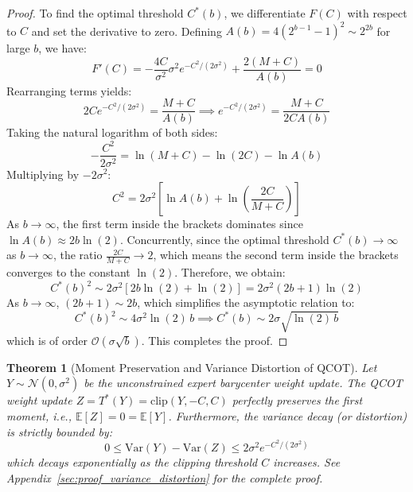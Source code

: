 \documentclass{article}
\theoremstyle{plain}
\newtheorem{theorem}{Theorem}[section]
\theoremstyle{definition}
\theoremstyle{remark}
\begin{document}
\begin{proof}
To find the optimal threshold $C^*(b)$, we differentiate $F(C)$ with respect to $C$ and set the derivative to zero. Defining $A(b) = 4 (2^{b-1} - 1)^2 \sim 2^{2b}$ for large $b$, we have:
\begin{equation}
    F'(C) = -\frac{4C}{\sigma^2} \sigma^2 e^{-C^2 / (2\sigma^2)} + \frac{2(M + C)}{A(b)} = 0
\end{equation}
Rearranging terms yields:
\begin{equation}
    2C e^{-C^2 / (2\sigma^2)} = \frac{M + C}{A(b)} \implies e^{-C^2 / (2\sigma^2)} = \frac{M + C}{2C A(b)}
\end{equation}
Taking the natural logarithm of both sides:
\begin{equation}
    -\frac{C^2}{2\sigma^2} = \ln(M + C) - \ln(2C) - \ln A(b)
\end{equation}
Multiplying by $-2\sigma^2$:
\begin{equation}
    C^2 = 2\sigma^2 \left[ \ln A(b) + \ln\left(\frac{2C}{M + C}\right) \right]
\end{equation}
As $b \to \infty$, the first term inside the brackets dominates since $\ln A(b) \approx 2b \ln(2)$. Concurrently, since the optimal threshold $C^*(b) \to \infty$ as $b \to \infty$, the ratio $\frac{2C}{M+C} \to 2$, which means the second term inside the brackets converges to the constant $\ln(2)$. Therefore, we obtain:
\begin{equation}
    C^*(b)^2 \sim 2\sigma^2 \left[ 2b \ln(2) + \ln(2) \right] = 2\sigma^2 (2b + 1) \ln(2)
\end{equation}
As $b \to \infty$, $(2b + 1) \sim 2b$, which simplifies the asymptotic relation to:
\begin{equation}
    C^*(b)^2 \sim 4\sigma^2 \ln(2) \, b \implies C^*(b) \sim 2\sigma \sqrt{\ln(2) \, b}
\end{equation}
which is of order $\mathcal{O}(\sigma \sqrt{b})$. This completes the proof.
\end{proof}

\begin{theorem}[Moment Preservation and Variance Distortion of QCOT]
Let $Y \sim \mathcal{N}(0, \sigma^2)$ be the unconstrained expert barycenter weight update. The QCOT weight update $Z = T^*(Y) = \text{clip}(Y, -C, C)$ perfectly preserves the first moment, i.e., $\mathbb{E}[Z] = 0 = \mathbb{E}[Y]$. Furthermore, the variance decay (or distortion) is strictly bounded by:
\begin{equation}
    0 \le \text{Var}(Y) - \text{Var}(Z) \le 2\sigma^2 e^{-C^2 / (2\sigma^2)}
\end{equation}
which decays exponentially as the clipping threshold $C$ increases. See Appendix~\ref{sec:proof_variance_distortion} for the complete proof.
\label{thm:variance_distortion}
\end{theorem}
\end{document}
